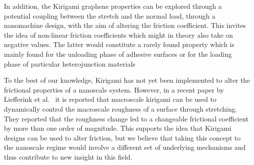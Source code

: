 In addition, the Kirigami graphene properties can be explored through a
potential coupling between the stretch and the normal load, through a
nanomachine design, with the aim of altering the friction coefficient. This
invites the idea of non-linear friction coefficients which might in theory also
take on negative values. The latter would constitute a rarely found property
which is mainly found for the unloading phase of adhesive surfaces
\cite{deng_adhesion-dependent_2012} or for the loading phase of particular heterojunction materials \cite{Liu_2020, Mandelli_2019}

To the best of our knowledge, Kirigami has not yet been implemented to alter the
frictional properties of a nanoscale system. However, in a recent paper by
Liefferink et al.\ \cite{LIEFFERINK2021101475} it is reported that macroscale
kirigami can be used to dynamically control the macroscale roughness of a
surface through stretching. They reported that the roughness change led to a
changeable frictional coefficient by more than one order of magnitude. This
supports the idea that Kirigami designs can be used to alter friction, but we
believe that taking this concept to the nanoscale regime would involve a different set of underlying mechanisms and thus contribute to new insight in
this field.











